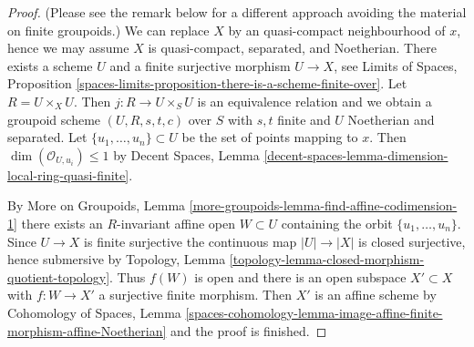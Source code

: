 \documentclass[10pt,a4paper]{amsart}
\theoremstyle{plain}
\theoremstyle{definition}
\theoremstyle{remark}
\numberwithin{equation}{subsection}
\begin{document}
\begin{proof}
(Please see the remark below for a different approach avoiding the material on
finite groupoids.) We can replace $X$ by an quasi-compact neighbourhood of
$x$, hence we may assume $X$ is quasi-compact, separated, and Noetherian.
There exists a scheme $U$ and a finite surjective morphism $U \to X$,
see Limits of Spaces, Proposition
\ref{spaces-limits-proposition-there-is-a-scheme-finite-over}.
Let $R = U \times_X U$. Then $j : R \to U \times_S U$ is an equivalence
relation and we obtain a groupoid scheme $(U, R, s, t, c)$ over $S$
with $s, t$ finite and $U$ Noetherian and separated.
Let $\{u_1, \ldots, u_n\} \subset U$ be the set of points mapping to $x$. 
Then $\dim(\mathcal{O}_{U, u_i}) \leq 1$ by
Decent Spaces, Lemma
\ref{decent-spaces-lemma-dimension-local-ring-quasi-finite}.

\medskip\noindent
By More on Groupoids, Lemma
\ref{more-groupoids-lemma-find-affine-codimension-1}
there exists an $R$-invariant affine open $W \subset U$ containing
the orbit $\{u_1, \ldots, u_n\}$. Since $U \to X$ is finite surjective
the continuous map $|U| \to |X|$ is closed surjective, hence
submersive by Topology, Lemma
\ref{topology-lemma-closed-morphism-quotient-topology}.
Thus $f(W)$ is open and there is an open subspace $X' \subset X$
with $f : W \to X'$ a surjective finite morphism.
Then $X'$ is an affine scheme by
Cohomology of Spaces, Lemma
\ref{spaces-cohomology-lemma-image-affine-finite-morphism-affine-Noetherian}
and the proof is finished.
\end{proof}
\end{document}

